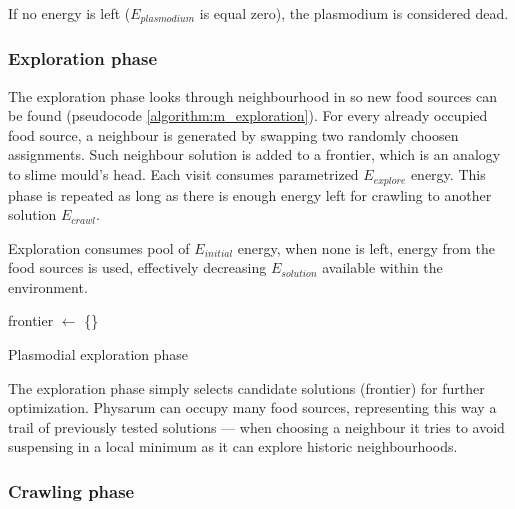 If no energy is left ($E_{plasmodium}$ is equal zero), the plasmodium is considered dead.


\subsubsection{Exploration phase}

The exploration phase looks through neighbourhood in so new food sources can be found (pseudocode \ref{algorithm:m_exploration}). For every already occupied food source, a neighbour is generated by swapping two randomly choosen assignments. Such neighbour solution is added to a frontier, which is an analogy to slime mould's head. Each visit consumes parametrized $E_{explore}$ energy. This phase is repeated as long as there is enough energy left for crawling to another solution $E_{crawl}$.

Exploration consumes pool of $E_{initial}$ energy, when none is left, energy from the food sources is used, effectively decreasing $E_{solution}$ available within the environment.

\begin{algorithm}
  \BlankLine

  frontier $\leftarrow$ \{\}\;

  \;

  \caption{Plasmodial exploration phase}
  \label{algorithm:m_exploration}
\end{algorithm}

The exploration phase simply selects candidate solutions (frontier) for further optimization. Physarum can occupy many food sources, representing this way a trail of previously tested solutions --- when choosing a neighbour it tries to avoid suspensing in a local minimum as it can explore historic neighbourhoods.

\subsubsection{Crawling phase}

